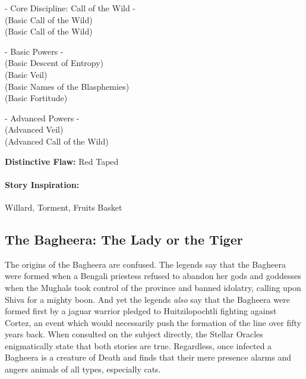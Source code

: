 \hspace{\parindent} - Core Discipline: Call of the Wild -\\
 (Basic Call of the Wild)\\
 (Basic Call of the Wild)

- Basic Powers -\\
 (Basic Descent of Entropy)\\
 (Basic Veil)\\
 (Basic Names of the Blasphemies)\\
 (Basic Fortitude)

- Advanced Powers -\\
 (Advanced Veil)\\
 (Advanced Call of the Wild)

\textbf{Distinctive Flaw:} Red Taped

\paragraph{Story Inspiration:} Willard, Torment, Fruits Basket

\subsection[Bagheera]{The Bagheera: The Lady or the Tiger} 

The origins of the Bagheera are confused. The legends say that the Bagheera were formed when a Bengali priestess refused to abandon her gods and goddesses when the Mughals took control of the province and banned idolatry, calling upon Shiva for a mighty boon. And yet the legends \textit{also} say that the Bagheera were formed first by a jaguar warrior pledged to Huitzilopochtli fighting against Cortez, an event which would necessarily push the formation of the line over fifty years back. When consulted on the subject directly, the Stellar Oracles enigmatically state that both stories are true. Regardless, once infected a Bagheera is a creature of Death and finds that their mere presence alarms and angers animals of all types, especially cats.

